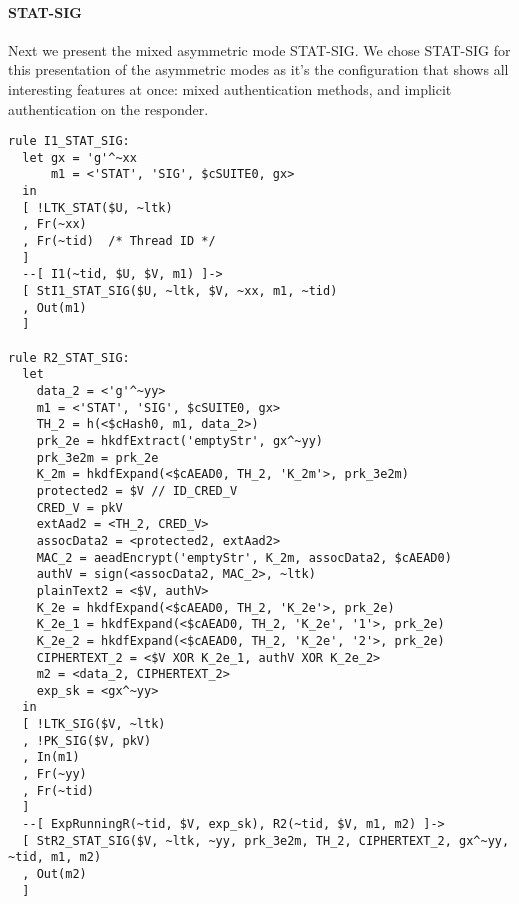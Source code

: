 \paragraph{STAT-SIG}
Next we present the mixed asymmetric mode STAT-SIG. We chose STAT-SIG
for this presentation of the asymmetric modes as it's the
configuration that shows all interesting features at once: mixed
authentication methods, and implicit authentication on the responder.

\begin{lstlisting}
rule I1_STAT_SIG:
  let gx = 'g'^~xx
      m1 = <'STAT', 'SIG', $cSUITE0, gx> 
  in
  [ !LTK_STAT($U, ~ltk)
  , Fr(~xx)
  , Fr(~tid)  /* Thread ID */
  ]
  --[ I1(~tid, $U, $V, m1) ]->
  [ StI1_STAT_SIG($U, ~ltk, $V, ~xx, m1, ~tid) 
  , Out(m1)
  ]

rule R2_STAT_SIG:
  let
    data_2 = <'g'^~yy>
    m1 = <'STAT', 'SIG', $cSUITE0, gx> 
    TH_2 = h(<$cHash0, m1, data_2>)
    prk_2e = hkdfExtract('emptyStr', gx^~yy)
    prk_3e2m = prk_2e
    K_2m = hkdfExpand(<$cAEAD0, TH_2, 'K_2m'>, prk_3e2m)
    protected2 = $V // ID_CRED_V
    CRED_V = pkV
    extAad2 = <TH_2, CRED_V> 
    assocData2 = <protected2, extAad2>
    MAC_2 = aeadEncrypt('emptyStr', K_2m, assocData2, $cAEAD0)
    authV = sign(<assocData2, MAC_2>, ~ltk)
    plainText2 = <$V, authV>
    K_2e = hkdfExpand(<$cAEAD0, TH_2, 'K_2e'>, prk_2e)
    K_2e_1 = hkdfExpand(<$cAEAD0, TH_2, 'K_2e', '1'>, prk_2e)
    K_2e_2 = hkdfExpand(<$cAEAD0, TH_2, 'K_2e', '2'>, prk_2e)
    CIPHERTEXT_2 = <$V XOR K_2e_1, authV XOR K_2e_2> 
    m2 = <data_2, CIPHERTEXT_2>
    exp_sk = <gx^~yy>
  in
  [ !LTK_SIG($V, ~ltk)
  , !PK_SIG($V, pkV)
  , In(m1)
  , Fr(~yy)
  , Fr(~tid)
  ]
  --[ ExpRunningR(~tid, $V, exp_sk), R2(~tid, $V, m1, m2) ]->
  [ StR2_STAT_SIG($V, ~ltk, ~yy, prk_3e2m, TH_2, CIPHERTEXT_2, gx^~yy, ~tid, m1, m2) 
  , Out(m2)
  ]


\end{lstlisting}
